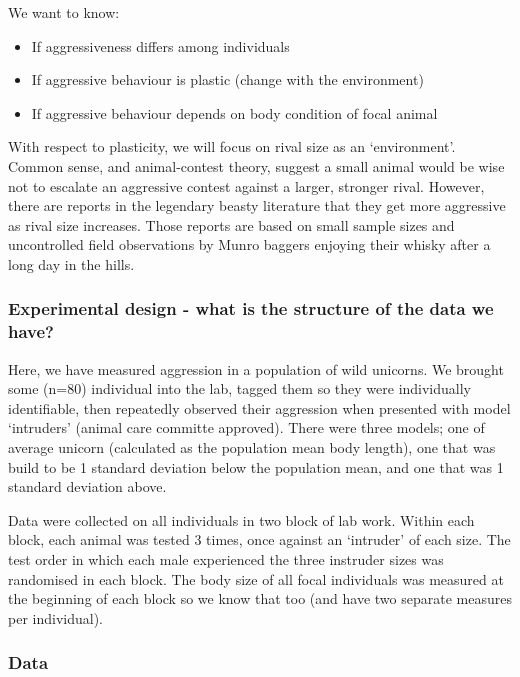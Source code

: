 \documentclass[
  12pt,
]{book}
\providecommand{\tightlist}{%
  \setlength{\itemsep}{0pt}\setlength{\parskip}{0pt}}
\begin{document}
We want to know:

\begin{itemize}
\tightlist
\item
  If aggressiveness differs among individuals
\item
  If aggressive behaviour is plastic (change with the environment)
\item
  If aggressive behaviour depends on body condition of focal animal
\end{itemize}

With respect to plasticity, we will focus on rival size as an `environment'. Common sense, and animal-contest theory, suggest a small animal would be wise not to escalate an aggressive contest against a larger, stronger rival. However, there are reports in the legendary beasty literature that they get more aggressive as rival size increases. Those reports are based on small sample sizes and uncontrolled field observations by Munro baggers enjoying their whisky after a long day in the hills.

\hypertarget{experimental-design---what-is-the-structure-of-the-data-we-have}{%
\subsubsection{Experimental design - what is the structure of the data we have?}\label{experimental-design---what-is-the-structure-of-the-data-we-have}}

Here, we have measured aggression in a population of wild unicorns. We brought some (n=80) individual into the lab, tagged them so they were individually identifiable, then repeatedly observed their aggression when presented with model `intruders' (animal care committe approved). There were three models; one of average unicorn (calculated as the population mean body length), one that was build to be 1 standard deviation below the population mean, and one that was 1 standard deviation above.

Data were collected on all individuals in two block of lab work. Within each block, each animal was tested 3 times, once against an `intruder' of each size. The test order in which each male experienced the three instruder sizes was randomised in each block. The body size of all focal individuals was measured at the beginning of each block so we know that too (and have two separate measures per individual).

\hypertarget{data}{%
\subsubsection{Data}\label{data}}
\end{document}
